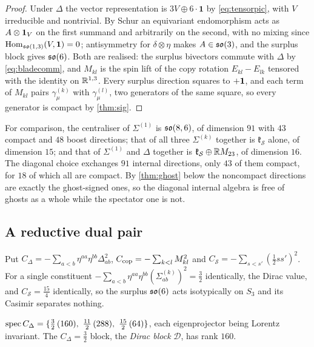 \begin{proof}
Under $\Delta$ the vector representation is $3V\oplus6\cdot\mathbf1$ by \eqref{eq:tensorpic}, with $V$ irreducible and nontrivial. By Schur
an equivariant endomorphism acts as $A\otimes\mathbf 1_V$ on the first summand and arbitrarily on the second, with no mixing since
$\operatorname{Hom}_{\mathfrak{so}(1,3)}(V,\mathbf1)=0$; antisymmetry for $\delta\otimes\eta$ makes $A\in\mathfrak{so}(3)$, and the surplus block gives $\mathfrak{so}(6)$. Both are
realised: the surplus bivectors commute with $\Delta$ by \eqref{eq:bladecomm}, and $M_{kl}$ is the spin lift of the copy rotation
$E_{kl}-E_{lk}$ tensored with the identity on $\mathbb{R}^{1,3}$. Every surplus direction squares to $+\mathbf 1$, and each term of $M_{kl}$ pairs
$\gamma^{(k)}_\mu$ with $\gamma^{(l)}_\mu$, two generators of the same square, so every generator is compact by \cref{thm:sig}.
\end{proof}

For comparison, the centraliser of $\Sigma^{(1)}$ is $\mathfrak{so}(8,6)$, of dimension $91$ with $43$ compact and $48$ boost directions; that of all
three $\Sigma^{(k)}$ together is $\mathfrak k_{\mathcal S}$ alone, of dimension $15$; and that of $\Sigma^{(1)}$ and $\Delta$ together is
$\mathfrak k_{\mathcal S}\oplus\mathbb{R} M_{23}$, of dimension $16$. The diagonal choice exchanges $91$ internal directions, only $43$ of them
compact, for $18$ of which all are compact. By \cref{thm:ghost} below the noncompact directions are exactly the ghost-signed ones, so the
diagonal internal algebra is free of ghosts as a whole while the spectator one is not.

\subsection{A reductive dual pair}
\label{sec:dualpair}

Put $C_\Delta=-\sum_{a<b}\eta^{aa}\eta^{bb}\Delta_{ab}^2$, $C_{\rm cop}=-\sum_{k<l}M_{kl}^2$ and $C_{\mathcal S}=-\sum_{s<s'}(\tfrac12ss')^2$. For a
single constituent $-\sum_{a<b}\eta^{aa}\eta^{bb}(\Sigma^{(k)}_{ab})^2=\tfrac32$ identically, the Dirac value, and $C_{\mathcal S}=\tfrac{15}4$
identically, so the surplus $\mathfrak{so}(6)$ acts isotypically on $S_3$ and its Casimir separates nothing.

\begin{theorem}
\label{thm:diagCspec}
$\spec C_\Delta=\{\tfrac32\,(160),\ \tfrac{11}2\,(288),\ \tfrac{15}2\,(64)\}$, each eigenprojector being Lorentz invariant. The
$C_\Delta=\tfrac32$ block, the \emph{Dirac block} $\mathcal D$, has rank $160$.
\end{theorem}


